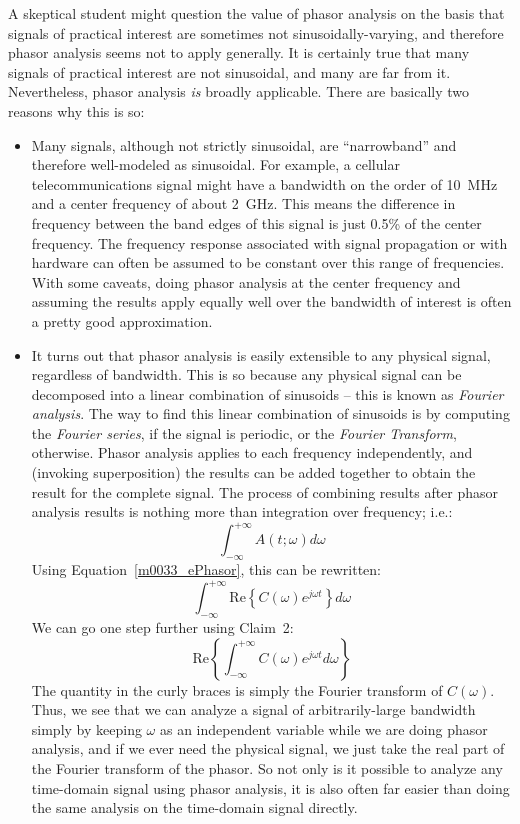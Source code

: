 A skeptical student might question the value of phasor analysis on the basis that signals of practical interest are sometimes not sinusoidally-varying, and therefore phasor analysis seems not to apply generally.  
It is certainly true that many signals of practical interest are not sinusoidal, and many are far from it.  
Nevertheless, phasor analysis \emph{is} broadly applicable.  There are basically two reasons why this is so:
%
\begin{itemize}
\item 
Many signals, although not strictly sinusoidal, are ``narrowband'' and therefore well-modeled as sinusoidal. 
For example,  a cellular telecommunications signal might have a bandwidth on the order of 10~MHz and a center frequency of about 2~GHz.  
This means the difference in frequency between the band edges of this signal is just 0.5\% of the center frequency.  
The frequency response associated with signal propagation or with hardware can often be assumed to be constant over this range of frequencies.   
With some caveats, doing phasor analysis at the center frequency and assuming the results apply equally well over the bandwidth of interest is often a pretty good approximation.
\item 
It turns out that phasor analysis is easily extensible to any physical signal, regardless of bandwidth.  
This is so because any physical signal can be decomposed into a linear combination of sinusoids -- this is known as \emph{Fourier analysis}. 
The way to find this linear combination of sinusoids is by computing the \emph{Fourier series}, 
if the signal is periodic, or the \emph{Fourier Transform}, 
otherwise.
Phasor analysis applies to each frequency independently, and (invoking superposition) the results can be added together to obtain the result for the complete signal.
The process of combining results after phasor analysis results is nothing more than integration over frequency; i.e.:
%
\begin{equation}
\int_{-\infty}^{+\infty} A(t;\omega) d\omega 
\nonumber
\end{equation}
%
Using Equation~\ref{m0033_ePhasor}, this can be rewritten:
%
\begin{equation}
\int_{-\infty}^{+\infty} \mbox{R{e}} \left\{ C(\omega) e^{j\omega t} \right\} d\omega
\nonumber
\end{equation}
%
We can go one step further using Claim~2:
\begin{equation}
\mbox{R{e}} \left\{  \int_{-\infty}^{+\infty} C(\omega) e^{j\omega t} d\omega \right\} 
\nonumber
\end{equation} 
%
The quantity in the curly braces is simply the Fourier transform of $C(\omega)$.   
Thus, we see that we can analyze a signal of arbitrarily-large bandwidth simply by keeping $\omega$ as an independent variable while we are doing phasor analysis, and if we ever need the physical signal, we just take the real part of the Fourier transform of the phasor.
So not only is it possible to analyze any time-domain signal using phasor analysis, it is also often far easier than doing the same analysis on the time-domain signal directly.
\end{itemize}

